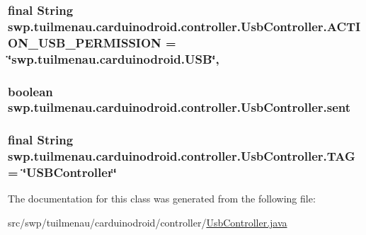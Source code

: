 \subsubsection[{A\+C\+T\+I\+O\+N\+\_\+\+U\+S\+B\+\_\+\+P\+E\+R\+M\+I\+S\+S\+I\+O\+N}]{\setlength{\rightskip}{0pt plus 5cm}final String swp.\+tuilmenau.\+carduinodroid.\+controller.\+Usb\+Controller.\+A\+C\+T\+I\+O\+N\+\_\+\+U\+S\+B\+\_\+\+P\+E\+R\+M\+I\+S\+S\+I\+O\+N = \char`\"{}swp.\+tuilmenau.\+carduinodroid.\+U\+S\+B\char`\"{}\hspace{0.3cm}{\ttfamily [static]}, {\ttfamily [protected]}}\label{classswp_1_1tuilmenau_1_1carduinodroid_1_1controller_1_1_usb_controller_ad2ce11a82a17ea79d48a3e8761b341cc}
\hypertarget{classswp_1_1tuilmenau_1_1carduinodroid_1_1controller_1_1_usb_controller_a18fb1eb53ea4080504f0840671fde0b5}{}
\subsubsection[{sent}]{\setlength{\rightskip}{0pt plus 5cm}boolean swp.\+tuilmenau.\+carduinodroid.\+controller.\+Usb\+Controller.\+sent}\label{classswp_1_1tuilmenau_1_1carduinodroid_1_1controller_1_1_usb_controller_a18fb1eb53ea4080504f0840671fde0b5}
\hypertarget{classswp_1_1tuilmenau_1_1carduinodroid_1_1controller_1_1_usb_controller_a7b414960182f31fe2af03326c29e0bf8}{}
\subsubsection[{T\+A\+G}]{\setlength{\rightskip}{0pt plus 5cm}final String swp.\+tuilmenau.\+carduinodroid.\+controller.\+Usb\+Controller.\+T\+A\+G = \char`\"{}U\+S\+B\+Controller\char`\"{}\hspace{0.3cm}{\ttfamily [static]}}\label{classswp_1_1tuilmenau_1_1carduinodroid_1_1controller_1_1_usb_controller_a7b414960182f31fe2af03326c29e0bf8}


The documentation for this class was generated from the following file\+:\begin{DoxyCompactItemize}
\item 
src/swp/tuilmenau/carduinodroid/controller/\hyperlink{_usb_controller_8java}{Usb\+Controller.\+java}\end{DoxyCompactItemize}
